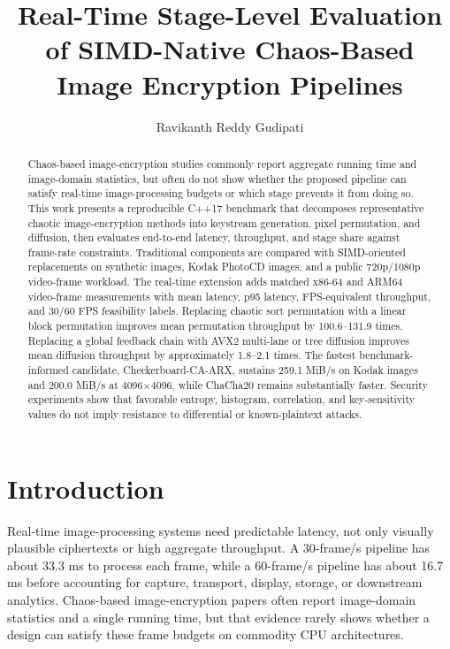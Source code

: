 \documentclass[twocolumn,runningheads]{svjour3}
\begin{document}
\title{Real-Time Stage-Level Evaluation of SIMD-Native Chaos-Based Image Encryption Pipelines}

\author{Ravikanth Reddy Gudipati}


\date{}

\maketitle

\begin{abstract}
Chaos-based image-encryption studies commonly report aggregate running time
and image-domain statistics, but often do not show whether the proposed
pipeline can satisfy real-time image-processing budgets or which stage prevents
it from doing so. This work presents a reproducible C++17 benchmark that
decomposes representative chaotic image-encryption methods into keystream
generation, pixel permutation, and diffusion, then evaluates end-to-end
latency, throughput, and stage share against frame-rate constraints.
Traditional components are compared with SIMD-oriented replacements on
synthetic images, Kodak PhotoCD images, and a public 720p/1080p video-frame
workload. The real-time extension adds matched x86-64 and ARM64 video-frame
measurements with mean latency, p95 latency, FPS-equivalent throughput, and
30/60 FPS feasibility labels. Replacing chaotic sort permutation with a linear
block permutation improves mean permutation throughput by 100.6--131.9 times.
Replacing a global feedback chain with AVX2 multi-lane or tree diffusion
improves mean diffusion throughput by approximately 1.8--2.1 times. The
fastest benchmark-informed candidate, Checkerboard-CA-ARX, sustains 259.1
MiB/s on Kodak images and 200.0 MiB/s at 4096$\times$4096, while ChaCha20
remains substantially faster. Security experiments show that favorable
entropy, histogram, correlation, and key-sensitivity values do not imply
resistance to differential or known-plaintext attacks.
\end{abstract}

\section{Introduction}
\label{sec:introduction}
Real-time image-processing systems need predictable latency, not
only visually plausible ciphertexts or high aggregate throughput. A
30-frame/s pipeline has about 33.3 ms to process each frame, while a
60-frame/s pipeline has about 16.7 ms before accounting for capture,
transport, display, storage, or downstream analytics. Chaos-based
image-encryption papers often report image-domain statistics and a single
running time, but that evidence rarely shows whether a design can satisfy
these frame budgets on commodity CPU architectures.
\end{document}
